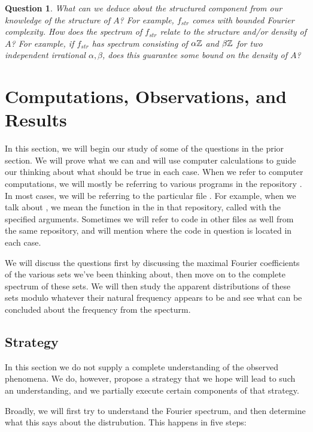 \documentclass{article}
\newtheorem{question}[theorem]{Question}
\theoremstyle{definition}
\theoremstyle{remark}
\numberwithin{equation}{section}
\begin{document}
\begin{question}\label{qn:fourier_complexity_density}
  What can we deduce about the structured component from our knowledge
  of the structure of $A$?  For example, $f_{str}$ comes with bounded
  Fourier complexity.  How does the spectrum of $f_{str}$ relate to
  the structure and/or density of $A$?  For example, if $f_{str}$ has
  spectrum consisting of $\alpha\mathbb{Z}$ and $\beta\mathbb{Z}$ for two independent
  irrational $\alpha, \beta$, does this guarantee some bound on the
  density of $A$?  
\end{question}

\section{Computations, Observations, and Results}

In this section, we will begin our study of some of the questions in
the prior section.  We will prove what we can and will use computer
calculations to guide our thinking about what should be true in each
case.  When we refer to computer computations, we will mostly be
referring to various programs in the repository \cite{computations}.
In most cases, we will be referring to the particular file
.  For example, when we talk about
, we mean the function 
in the  in that repository, called with the
specified arguments.  Sometimes we will refer to code in other files
as well from the same repository, and will mention where the code in
question is located in each case.

We will discuss the questions first by discussing the maximal Fourier
coefficients of the various sets we've been thinking about, then move
on to the complete spectrum of these sets.  We will then study the
apparent distributions of these sets modulo whatever their natural
frequency appears to be and see what can be concluded about the
frequency from the specturm. 

\subsection{Strategy}

In this section we do not supply a complete understanding of the
observed phenomena.  We do, however, propose a strategy that we hope
will lead to such an understanding, and we partially execute certain
components of that strategy.

Broadly, we will first try to understand the Fourier spectrum, and
then determine what this says about the distrubution.  This happens in
five steps: 
\end{document}
